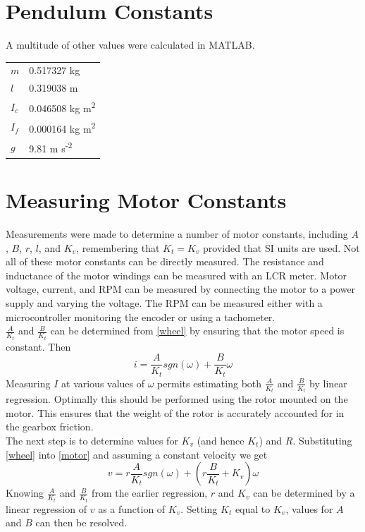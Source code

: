 \documentclass[12pt,letterpaper]{article}
\begin{document}
\begin{appendices}
\section{Pendulum Constants}
A multitude of other values were calculated in MATLAB.  \\

\begin{tabular}{l l}
$m$ & 0.517327 kg \\
$l$ & 0.319038 m \\
$I_{c}$ & 0.046508 kg m\textsuperscript{2} \\
$I_{f}$ & 0.000164 kg m\textsuperscript{2} \\
$g$ & 9.81 m s\textsuperscript{-2} \\
\end{tabular}




\section{Measuring Motor Constants}
\label{appendix:measure}
Measurements were made to determine a number of motor constants, including $A$, $B$, $r$, $l$, and $K_{v}$, remembering that $K_{t} = K_{v}$ provided that SI units are used.  Not all of these motor constants can be directly measured.  The resistance and inductance of the motor windings can be measured with an LCR meter.
Motor voltage, current, and RPM can be measured by connecting the motor to a power supply and varying the voltage.  The RPM can be measured either with a microcontroller monitoring the encoder or using a tachometer.\\

$\frac{A}{K_{t}}$ and $\frac{B}{K_{t}}$ can be determined from \eqref{wheel} by ensuring that the motor speed is constant.  Then
\begin{equation}
    i = \frac{A}{K_{t}}sgn(\omega) + \frac{B}{K_{t}} \omega
\end{equation}
Measuring $I$ at various values of $\omega$ permits estimating both $\frac{A}{K_{t}}$ and $\frac{B}{K_{t}}$ by linear
regression.  Optimally this should be performed using the rotor mounted on the motor. This ensures that
the weight of the rotor is accurately accounted for in the gearbox friction.\\

The next step is to determine values for $K_{v}$ (and hence $K_{t}$) and $R$.  Substituting \eqref{wheel} into \eqref{motor} and assuming a constant velocity we get
\begin{equation}
    v = r\frac{A}{K_{t}}sgn(\omega) + (r\frac{B}{K_{t}}+K_{v}) \omega
\end{equation}
Knowing $\frac{A}{K_{t}}$ and $\frac{B}{K_{t}}$ from the earlier regression, $r$ and $K_{v}$ can be determined by a linear regression of $v$ as a function of $K_{v}$.  Setting $K_{t}$ equal to $K_{v}$, values for $A$ and $B$ can then be resolved.\\


\end{appendices}
\end{document}
